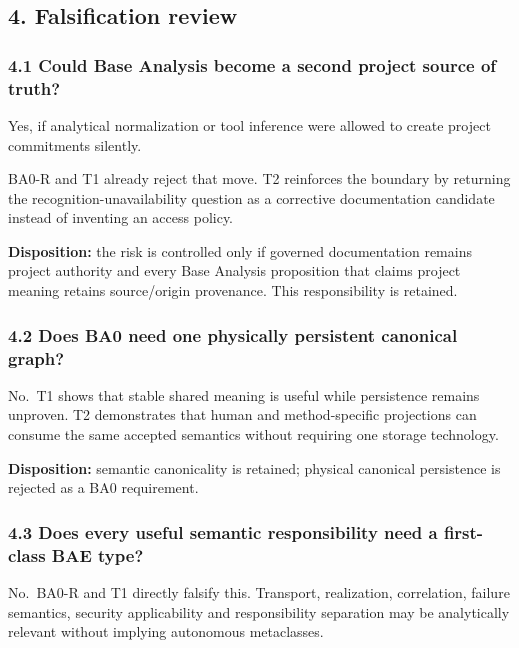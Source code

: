 \documentclass[
  10pt,
]{article}
\begin{document}
\subsection{4. Falsification review}\label{falsification-review}

\subsubsection{4.1 Could Base Analysis become a second project source of
truth?}\label{could-base-analysis-become-a-second-project-source-of-truth}

Yes, if analytical normalization or tool inference were allowed to
create project commitments silently.

BA0-R and T1 already reject that move. T2 reinforces the boundary by
returning the recognition-unavailability question as a corrective
documentation candidate instead of inventing an access policy.

\textbf{Disposition:} the risk is controlled only if governed
documentation remains project authority and every Base Analysis
proposition that claims project meaning retains source/origin
provenance. This responsibility is retained.

\subsubsection{4.2 Does BA0 need one physically persistent canonical
graph?}\label{does-ba0-need-one-physically-persistent-canonical-graph}

No.~T1 shows that stable shared meaning is useful while persistence
remains unproven. T2 demonstrates that human and method-specific
projections can consume the same accepted semantics without requiring
one storage technology.

\textbf{Disposition:} semantic canonicality is retained; physical
canonical persistence is rejected as a BA0 requirement.

\subsubsection{4.3 Does every useful semantic responsibility need a
first-class BAE
type?}\label{does-every-useful-semantic-responsibility-need-a-first-class-bae-type}

No.~BA0-R and T1 directly falsify this. Transport, realization,
correlation, failure semantics, security applicability and
responsibility separation may be analytically relevant without implying
autonomous metaclasses.
\end{document}
